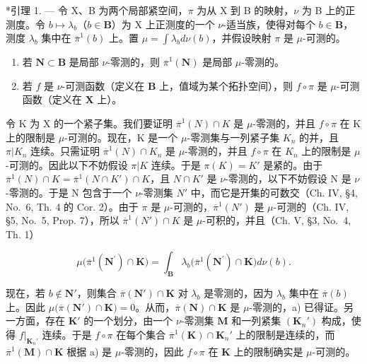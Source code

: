 \appendixheading

*引理 1. --- 令 X、B 为两个局部紧空间，\(\pi\) 为从 X 到 B 的映射，\(\nu\) 为 B 上的正测度。令 \(b \mapsto \lambda_b\)（\(b \in \mathbf{B}\)）为 X 上正测度的一个 \(\nu\)-适当族，使得对每个 \(b \in \mathbf{B}\)，测度 \(\lambda_b\) 集中在 \(\overline{\pi}^1(b)\) 上。置 \(\mu = \int \lambda_b d\nu(b)\)，并假设映射 \(\pi\) 是 \(\mu\)-可测的。

\begin{enumerate}
\def\labelenumi{\alph{enumi})}
\item
  若 \(\mathbf{N} \subset \mathbf{B}\) 是局部 \(\nu\)-零测的，则 \(\overline{\pi}^1(\mathbf{N})\) 是局部 \(\mu\)-零测的。
\item
  若 \(f\) 是 \(\nu\)-可测函数（定义在 \(\mathbf{B}\) 上，值域为某个拓扑空间），则 \(f \circ \pi\) 是 \(\mu\)-可测函数（定义在 \(\mathbf{X}\) 上）。
\end{enumerate}

令 K 为 X 的一个紧子集。我们要证明 \(\overline{\pi}^{1}(N) \cap K\) 是 \(\mu\)-零测的，并且 \(f \circ \pi\) 在 K 上的限制是 \(\mu\)-可测的。现在，K 是一个 \(\mu\)-零测集与一列紧子集 \(K_{n}\) 的并，且 \(\pi|K_{n}\) 连续。只需证明 \(\overline{\pi}^{1}(N) \cap K_{n}\) 是 \(\mu\)-零测的，并且 \(f \circ \pi\) 在 \(K_{n}\) 上的限制是 \(\mu\)-可测的。因此以下不妨假设 \(\pi|K\) 连续。于是 \(\pi(K) = K'\) 是紧的。由于 \(\overline{\pi}^{1}(N) \cap K = \overline{\pi}^{1}(N \cap K') \cap K\)，且 \(N \cap K'\) 是 \(\nu\)-零测的，以下不妨假设 N 是 \(\nu\)-零测的。于是 N 包含于一个 \(\nu\)-零测集 \(N'\) 中，而它是开集的可数交（Ch. IV, §4, No.~6, Th. 4 的 Cor. 2）。由于 \(\pi\) 是 \(\mu\)-可测的，\(\overline{\pi}^{1}(N')\) 是 \(\mu\)-可测的（Ch. IV, §5, No.~5, Prop. 7），所以 \(\overline{\pi}^{1}(N') \cap K\) 是 \(\mu\)-可积的，并且（Ch. V, §3, No.~4, Th. 1）

\[
\mu \big (\overline {{{{\pi}}}} ^ {1} (\mathbf {N} ^ {\prime}) \cap \mathbf {K} \big) = \int_ {\mathbf {B}} \lambda_ {b} \big (\overline {{{{\pi}}}} ^ {1} (\mathbf {N} ^ {\prime}) \cap \mathbf {K} \big) d \nu (b).
\]

现在，若 \(b \notin \mathbf{N}'\)，则集合 \(\overline{\pi}(\mathbf{N}') \cap \mathbf{K}\) 对 \(\lambda_b\) 是零测的，因为 \(\lambda_b\) 集中在 \(\overline{\pi}(b)\) 上。因此 \(\mu\big(\overline{\pi}(\mathbf{N}') \cap \mathbf{K}\big) = 0\)。从而，\(\overline{\pi}(\mathbf{N}) \cap \mathbf{K}\) 是 \(\mu\)-零测的，a) 已得证。另一方面，存在 \(\mathbf{K}'\) 的一个划分，由一个 \(\nu\)-零测集 \(\mathbf{M}\) 和一列紧集 \((\mathbf{K}_n')\) 构成，使得 \(f|_{\mathbf{K}_n'}\) 连续。于是 \(f \circ \pi\) 在每个集合 \(\overline{\pi}^1(\mathbf{K}) \cap \mathbf{K}_n'\) 上的限制是连续的，而 \(\overline{\pi}^1(\mathbf{M}) \cap \mathbf{K}\) 根据 a) 是 \(\mu\)-零测的，因此 \(f \circ \pi\) 在 \(\mathbf{K}\) 上的限制确实是 \(\mu\)-可测的。

